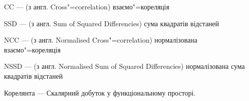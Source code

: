 \shortings{}
CC --- (з англ. Cross"=correlation) взаємо"=кореляція

SSD --- (з англ. Sum of Squared Differencies) сума квадратів відстаней

NCC --- (з англ. Normalised Cross"=correlation) нормалізована взаємо"=кореляція

NSSD --- (з англ. Normalised Sum of Squared Differencies) нормалізована сума квадратів відстаней

Корелянта --- Скалярний добуток у функціональному просторі.

